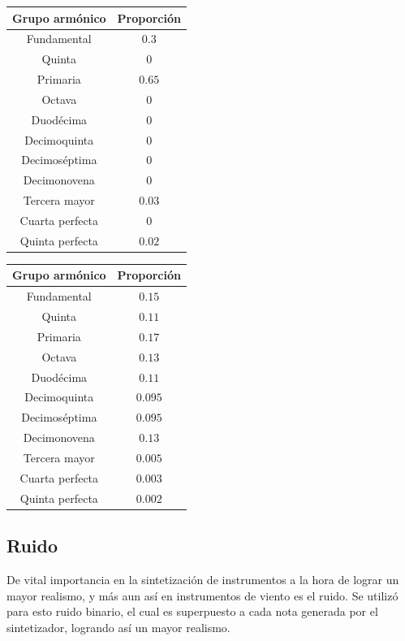 \begin{multicols}{2}
\begin{table}[H]
\centering
\begin{tabular}{@{}cc@{}}
\toprule
\textbf{Grupo armónico} & \textbf{Proporción} \\ \midrule
Fundamental & $0.3$ \\ 
Quinta & $0$ \\ 
 Primaria& $0.65$ \\ 
 Octava& $0$ \\ 
 Duodécima& $0$ \\ 
 Decimoquinta& $0$ \\ 
 Decimoséptima& $0$ \\ 
 Decimonovena& $0$ \\ 
 Tercera mayor& $0.03$ \\ 
 Cuarta perfecta& $0$ \\ 
 Quinta perfecta& $0.02$ \\ \bottomrule
\end{tabular}
\end{table}
\begin{table}[H]
\centering
\begin{tabular}{@{}cc@{}}
\toprule
\textbf{Grupo armónico} & \textbf{Proporción} \\ \midrule
Fundamental & $0.15$ \\ 
Quinta & $0.11$ \\ 
 Primaria& $0.17$ \\ 
 Octava& $0.13$ \\ 
 Duodécima& $0.11$ \\ 
 Decimoquinta& $0.095$ \\ 
 Decimoséptima& $0.095$ \\ 
 Decimonovena& $0.13$ \\ 
 Tercera mayor& $0.005$ \\ 
 Cuarta perfecta& $0.003$ \\ 
 Quinta perfecta& $0.002$ \\ \bottomrule
\end{tabular}
\end{table}
\end{multicols}

\subsection{Ruido}

De vital importancia en la sintetización de instrumentos a la hora de lograr un mayor realismo, y más aun así en instrumentos de viento es el ruido. Se utilizó para esto ruido binario, el cual es superpuesto a cada nota generada por el sintetizador, logrando así un mayor realismo.

